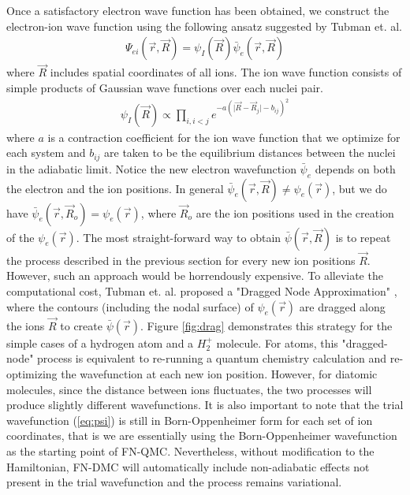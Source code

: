 \documentclass[aps,prl,superscriptaddress,groupedaddress]{revtex4}
\begin{document}
Once a satisfactory electron wave function has been obtained, we construct the electron-ion wave function using the following ansatz suggested by Tubman et. al.\cite{Tubman_ECG}
\begin{align}
\Psi_{ei}(\vec{r},\vec{R})=\psi_I(\vec{R})\bar{\psi}_e(\vec{r},\vec{R}) \label{eq:psi}
\end{align}
where $\vec{R}$ includes spatial coordinates of all ions. The ion wave function consists of simple products of Gaussian wave functions over each nuclei pair.
\begin{align}
\psi_I(\vec{R})\propto \prod\limits_{i,i<j}e^{-a(\vert \vec{R}-\vec{R}_j\vert-b_{ij})^2}
\end{align}
where $a$ is a contraction coefficient for the ion wave function that we optimize for each system and $b_{ij}$ are taken to be the equilibrium distances between the nuclei in the adiabatic limit. Notice the new electron wavefunction $\bar{\psi}_e$ depends on both the electron and the ion positions. In general $\bar{\psi}_e(\vec{r},\vec{R})\neq\psi_e(\vec{r})$, but we do have $\bar{\psi}_e(\vec{r},\vec{R}_o)=\psi_e(\vec{r})$, where $\vec{R}_o$ are the ion positions used in the creation of the $\psi_e(\vec{r})$. The most straight-forward way to obtain $\bar{\psi}(\vec{r},\vec{R})$ is to repeat the process described in the previous section for every new ion positions $\vec{R}$. However, such an approach would be horrendously expensive. To alleviate the computational cost, Tubman et. al. proposed a "Dragged Node Approximation" \cite{Tubman_ECG}, where the contours (including the nodal surface) of $\psi_e(\vec{r})$ are dragged along the ions $\vec{R}$ to create $\bar{\psi}(\vec{r})$. Figure \ref{fig:drag} demonstrates this strategy for the simple cases of a hydrogen atom and a $H_2^+$ molecule. For atoms, this "dragged-node" process is equivalent to re-running a quantum chemistry calculation and re-optimizing the wavefunction at each new ion position. However, for diatomic molecules, since the distance between ions fluctuates, the two processes will produce slightly different wavefunctions. It is also important to note that the trial wavefunction (\ref{eq:psi}) is still in Born-Oppenheimer form for each set of ion coordinates, that is we are essentially using the Born-Oppenheimer wavefunction as the starting point of FN-QMC. Nevertheless, without modification to the Hamiltonian, FN-DMC will automatically include non-adiabatic effects not present in the trial wavefunction and the process remains variational.
\end{document}
